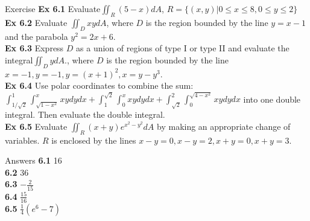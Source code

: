 \documentclass[aspectratio=169, UTF8]{beamer}
\begin{document}
\begin{frame}{Exercise}
    \textbf{Ex 6.1 }Evaluate$\iint_R(5-x)dA$, $R=\{(x,y)|0\leq x
    \leq 8,0\leq y\leq2\}$\\

    \textbf{Ex 6.2 }Evaluate $\iint_DxydA$, where $D$ is the region bounded by the line $y=x-1$ and the parabola $y^2=2x+6$.\\

    \textbf{Ex 6.3 }Express $D$ as a union of regions of type I or type II and evaluate the integral$\iint_D ydA$., where $D$ is the region bounded by the line $x=-1,y=-1,y=(x+1)^2,x=y-y^3$.\\

     \textbf{Ex 6.4} Use polar coordinates to combine the sum:
     $\int_{1/\sqrt{2}}^1\int_{\sqrt{1-x^2}}^xxydydx+\int_1^{\sqrt{2}}\int_0^xxydydx+\int_{\sqrt{2}}^2\int_0^{\sqrt{4-x^2}}xydydx$ into one double integral. Then evaluate the double integral.\\

    \textbf{Ex 6.5} Evaluate $\iint_R(x+y)e^{x^2-y^2}dA$ by making an appropriate change of variables. $R$ is enclosed by the lines $x-y=0,x-y=2,x+y=0,x+y=3$.
\end{frame}
\begin{frame}{Answers}
    \textbf{6.1} 16\\
    \textbf{6.2} 36\\
    \textbf{6.3} $-\frac{2}{15}$\\
    \textbf{6.4} $\frac{15}{16}$\\
    \textbf{6.5} $\frac{1}{4}(e^6-7)$
\end{frame}
\end{document}
